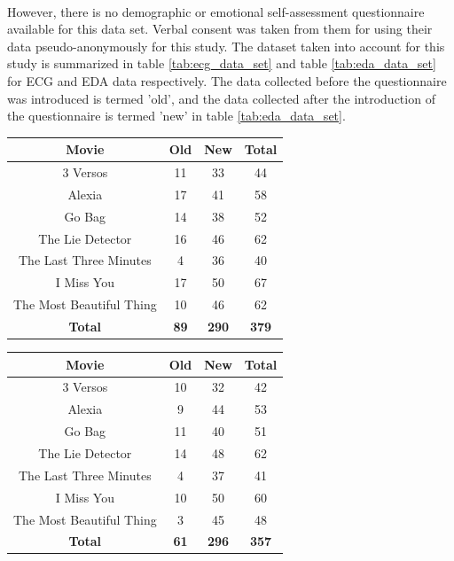 \paragraph{}However, there is no demographic or emotional self-assessment questionnaire available for this data set. Verbal consent was taken from them for using their data pseudo-anonymously for this study. The dataset taken into account for this study is summarized in table \ref{tab:ecg_data_set} and table \ref{tab:eda_data_set} for ECG and EDA data respectively. The data collected before the questionnaire was introduced is termed 'old', and the data collected after the introduction of the questionnaire is termed 'new' in table \ref{tab:eda_data_set}. 


\begin{center}
\begin{tabular}{ |c|c|c|c| }
\hline
\textbf{Movie} & \textbf{Old} & \textbf{New} & \textbf{Total} \\
\hline
\hline
3 Versos & 11 & 33 & 44 \\
\hline
Alexia & 17 & 41 & 58 \\
\hline
Go Bag & 14 & 38 & 52 \\
\hline
The Lie Detector & 16 & 46 & 62 \\
\hline
The Last Three Minutes & 4 & 36 & 40 \\
\hline
I Miss You & 17 & 50 & 67 \\
\hline
The Most Beautiful Thing & 10 & 46 & 62 \\
\hline
\textbf{Total} & \textbf{89} & \textbf{290} & \textbf{379} \\
\hline
\end{tabular}
\label{tab:ecg_data_set}
\end{center}

\begin{center}
\begin{tabular}{ |c|c|c|c| }
\hline
 \textbf{Movie} & \textbf{Old} & \textbf{New} & \textbf{Total} \\
\hline
\hline
3 Versos & 10 & 32 & 42 \\
\hline
Alexia & 9 & 44 & 53 \\
\hline
Go Bag & 11 & 40 & 51 \\
\hline
The Lie Detector & 14 & 48 & 62 \\
\hline
The Last Three Minutes & 4 & 37 & 41 \\
\hline
I Miss You & 10 & 50 & 60 \\
\hline
The Most Beautiful Thing & 3 & 45 & 48 \\
\hline
\textbf{Total} & \textbf{61} & \textbf{296} & \textbf{357} \\
\hline
\end{tabular}
\label{tab:eda_data_set}
\end{center}

